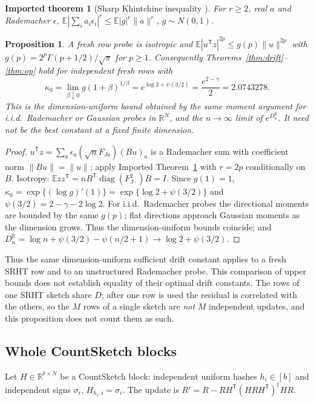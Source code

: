 \documentclass[11pt,a4paper]{article}
\newtheorem{proposition}[theorem]{Proposition}
\newtheorem{imported}[theorem]{Imported theorem}
\theoremstyle{definition}\newtheorem{definition}[theorem]{Definition}
\theoremstyle{remark}\newtheorem{remark}[theorem]{Remark}
\numberwithin{equation}{section}
\newcommand{\E}{\mathbb E}
\newcommand{\R}{\mathbb R}
\newcommand{\diag}{\operatorname{diag}}
\newcommand{\norm}[1]{\lVert#1\rVert}
\begin{document}
\begin{imported}[Sharp Khintchine inequality {\cite{Haagerup}}]\label{imp:khintchine}
For $r\ge2$, real $a$ and Rademacher $\epsilon$,
$\E|\sum_ia_i\epsilon_i|^r\le\E|g|^r\norm a^r$, $g\sim N(0,1)$.
\end{imported}

\begin{proposition}\label{prop:srht}
A fresh row probe is isotropic and $\E|u^{\mathsf T}z|^{2p}\le g(p)\norm u^{2p}$ with
$g(p)=2^p\Gamma(p+1/2)/\sqrt\pi$ for $p\ge1$. Consequently
Theorems~\ref{thm:drift}--\ref{thm:op} hold for independent fresh rows with
\[
 \kappa_0=\lim_{\beta\downarrow0}g(1+\beta)^{1/\beta}=e^{\log2+\psi(3/2)}=\frac{e^{2-\gamma}}2=2.0743278 .
\]
This is the dimension-uniform bound obtained by the same moment argument for
i.i.d.\ Rademacher or Gaussian probes in $\R^N$, and the $n\to\infty$ limit of
$e^{D_n^{\R}}$. It need not be the best constant at a fixed finite dimension.
\end{proposition}
\begin{proof}
$u^{\mathsf T}z=\sum_a\epsilon_a(\sqrt nF_{Ja})(Bu)_a$ is a Rademacher sum with
coefficient norm $\norm{Bu}=\norm u$; apply Imported Theorem~\ref{imp:khintchine}
with $r=2p$ conditionally on $B$. Isotropy: $\E zz^{\mathsf T}=nB^{\mathsf T}\diag(F_{J\cdot}^2)B=I$.
Since $g(1)=1$, $\kappa_0=\exp\{(\log g)'(1)\}=\exp\{\log2+\psi(3/2)\}$ and
$\psi(3/2)=2-\gamma-2\log2$. For i.i.d.\ Rademacher probes the directional
moments are bounded by the same $g(p)$; flat directions approach Gaussian
moments as the dimension grows. Thus the dimension-uniform bounds coincide; and $D_n^{\R}=\log n+\psi(3/2)-\psi(n/2+1)\to\log2+\psi(3/2)$.
\end{proof}
Thus the same dimension-uniform sufficient drift constant applies to a
fresh SRHT row and to an unstructured Rademacher probe. This comparison of
upper bounds does not establish equality of their optimal drift constants. The rows of one SRHT sketch share $D$; after one row is
used the residual is correlated with the others, so the $M$ rows of a single
sketch are \emph{not} $M$ independent updates, and this proposition does not
count them as such.

\subsection{Whole CountSketch blocks}
Let $H\in\R^{b\times N}$ be a CountSketch block: independent uniform hashes
$h_i\in[b]$ and independent signs $\sigma_i$, $H_{h_i,i}=\sigma_i$. The update is
$R'=R-RH^{\mathsf T}(HRH^{\mathsf T})^\dagger HR$.
\end{document}
